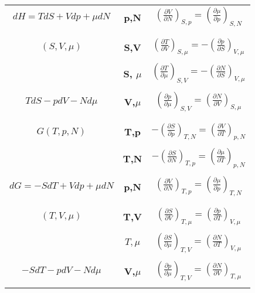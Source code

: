 \documentclass{article}
\begin{document}
\begin{tabular}{|>{\Large\bfseries}c|>{\Large\bfseries}c|>{\Large\bfseries}c|}
    \normalfont $dH=TdS+Vdp + \mu dN$ & \normalfont p,N & $(\frac{\partial V}{\partial N})_{S,p}= (\frac{\partial \mu}{\partial p})_{S,N}$ \\
    & & \\
    \hline
    & & \\
    \normalfont $(S,V, \mu)$ & \normalfont S,V & \normalfont $(\frac{\partial T}{\partial V})_{S, \mu} = -(\frac{\partial p}{\partial S})_{V, \mu} $ \\
    & & \\
    & \normalfont S, $\mu$  & \normalfont $(\frac{\partial T }{\partial \mu})_{S,V}= -(\frac{\partial N}{\partial S})_{V,\mu}$ \\
    & & \\
    \normalfont $TdS-pdV-Nd \mu$ & \normalfont V,$\mu$ & \normalfont $(\frac{\partial p}{\partial \mu})_{S,V} = (\frac{\partial N}{\partial V	})_{S, \mu}$ \\    
    & & \\    
    \hline
    & & \\
    \normalfont $G(T,p,N)$ & \normalfont T,p & \normalfont $-(\frac{\partial S}{\partial p})_{T,N}= (\frac{\partial V}{\partial T})_{p,N}$ \\
    & & \\
    & \normalfont T,N & \normalfont $-(\frac{\partial S }{\partial N})_{T,p}=(\frac{\partial \mu}{\partial T})_{p,N}$ \\
    & & \\
    \normalfont $dG=-SdT+Vdp+ \mu dN$ & \normalfont p,N & \normalfont $(\frac{\partial V}{\partial N})_{T,p}= (\frac{\partial \mu}{\partial p})_{T,N}$ \\
    & & \\
    \hline
    & & \\
    \normalfont $(T,V, \mu)$ & \normalfont T,V & \normalfont $(\frac{\partial S}{\partial V})_{T, \mu} = (\frac{\partial p}{\partial T})_{V, \mu}$ \\
    & & \\
    & \normalfont $T, \mu$ & \normalfont $(\frac{\partial S}{\partial \mu})_{T,V}= (\frac{\partial N}{\partial T})_{V,\mu}$ \\    
    & & \\
    \normalfont $-SdT-pdV-Nd \mu$ & \normalfont V,$\mu$ & \normalfont $(\frac{\partial p}{\partial \mu })_{T,V}= (\frac{\partial N}{\partial V})_{T,\mu}$ \\
    & & \\
    \hline  
\end{tabular}
 
\end{document}
